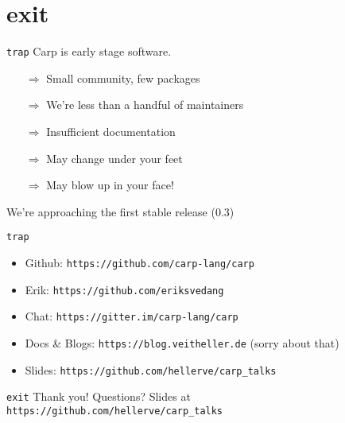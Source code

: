 \documentclass[aspectratio=169]{beamer}
\begin{document}
  \section{exit}
  \begin{frame}{\texttt{trap}}
    Carp is early stage software.
    \begin{itemize}
      \item[$\Rightarrow$] Small community, few packages
      \item[$\Rightarrow$] We’re less than a handful of maintainers
      \item[$\Rightarrow$] Insufficient documentation
      \item[$\Rightarrow$] May change under your feet
      \item[$\Rightarrow$] May blow up in your face!
    \end{itemize}
    We’re approaching the first stable release (0.3)
  \end{frame}
  \begin{frame}{\texttt{trap}}
    \begin{itemize}
      \item Github: \texttt{https://github.com/carp-lang/carp}
      \item Erik: \texttt{https://github.com/eriksvedang}
      \item Chat: \texttt{https://gitter.im/carp-lang/carp}
      \item Docs \& Blogs: \texttt{https://blog.veitheller.de} (sorry about that)
      \item Slides: \texttt{https://github.com/hellerve/carp\_talks}
    \end{itemize}
  \end{frame}
  \begin{frame}{\texttt{exit}}
    \Huge Thank you!
    \linebreak
    \linebreak
    \linebreak
    \small Questions?
    \linebreak
    \linebreak
    \tiny Slides at \texttt{https://github.com/hellerve/carp\_talks}
  \end{frame}
\end{document}
